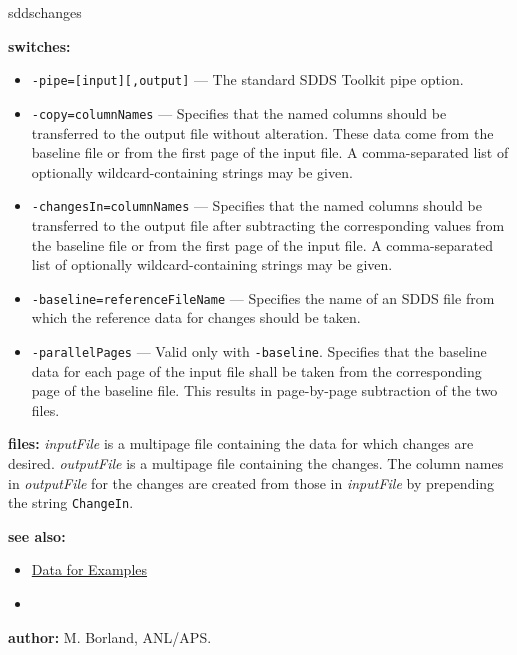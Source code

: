 \begin{sddsprog}{sddschanges}
  \item \textbf{switches:}
    \begin{itemize}
      \item \verb|-pipe=[input][,output]| --- The standard SDDS Toolkit pipe option.
      \item \verb|-copy=columnNames| --- Specifies that the named columns should be transferred to the output file without alteration. These data come from the baseline file or from the first page of the input file. A comma-separated list of optionally wildcard-containing strings may be given.
      \item \verb|-changesIn=columnNames| --- Specifies that the named columns should be transferred to the output file after subtracting the corresponding values from the baseline file or from the first page of the input file. A comma-separated list of optionally wildcard-containing strings may be given.
      \item \verb|-baseline=referenceFileName| --- Specifies the name of an SDDS file from which the reference data for changes should be taken.
      \item \verb|-parallelPages| --- Valid only with \verb|-baseline|. Specifies that the baseline data for each page of the input file shall be taken from the corresponding page of the baseline file. This results in page-by-page subtraction of the two files.
    \end{itemize}

  \item \textbf{files:}
    \emph{inputFile} is a multipage file containing the data for which changes are desired. \emph{outputFile} is a multipage file containing the changes. The column names in \emph{outputFile} for the changes are created from those in \emph{inputFile} by prepending the string \verb|ChangeIn|.

  \item \textbf{see also:}
    \begin{itemize}
      \item \hyperref[exampleData]{Data for Examples}
      \item {}
    \end{itemize}

  \item \textbf{author:} M. Borland, ANL/APS.
\end{sddsprog}
